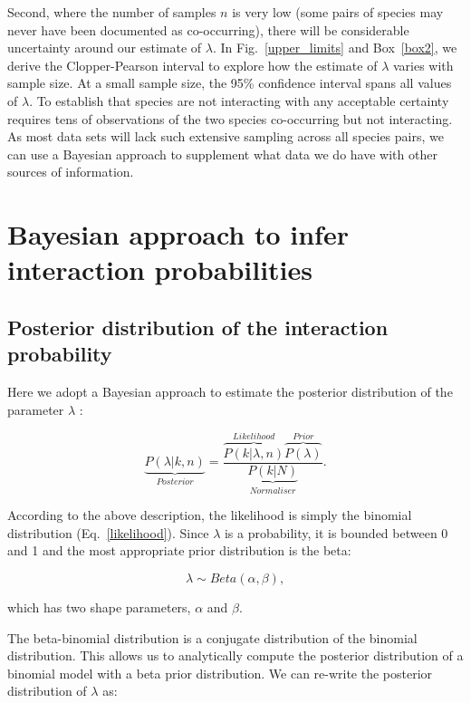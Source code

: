 \documentclass[12pt]{article}
\begin{document}
\begin{spacing}{2.0}
  Second, where the number of samples $n$ is very low (some pairs of species may never have been documented as co-occurring), there will be considerable uncertainty around our estimate of $\lambda$. In Fig.~\ref{upper_limits} and Box~\ref{box2}, we derive the Clopper-Pearson interval to explore how the estimate of $\lambda$ varies with sample size. At a small sample size, the 95\% confidence interval spans all values of $\lambda$. To establish that species are not interacting with any acceptable certainty requires tens of observations of the two species co-occurring but not interacting. As most data sets will lack such extensive sampling across all species pairs, we can use a Bayesian approach to supplement what data we do have with other sources of information.


\section*{Bayesian approach to infer interaction probabilities}

    \subsection*{Posterior distribution of the interaction probability}

      Here we adopt a Bayesian approach to estimate the posterior distribution of the parameter $\lambda$ :

      \begin{equation}
        \underbrace{P(\lambda|k,n)}_{Posterior} = \frac{\overbrace{P(k|\lambda,n)}^{Likelihood}\overbrace{P(\lambda)}^{Prior}}{\underbrace{P(k|N)}_{Normaliser}} .
        \label{posterior}
      \end{equation}

      According to the above description, the likelihood is simply the binomial distribution (Eq.~\ref{likelihood}). Since $\lambda$ is a probability, it is bounded between 0 and 1 and the most appropriate prior distribution is the beta:

      \begin{equation}
        \lambda \sim Beta(\alpha,\beta) , \label{prior}
      \end{equation}

      \noindent which has two shape parameters, $\alpha$ and $\beta$. 

     The beta-binomial distribution is a conjugate distribution of the binomial distribution. This allows us to analytically compute the posterior distribution of a binomial model with a beta prior distribution. We can re-write the posterior distribution of $\lambda$ as:


\end{spacing}
\end{document}
